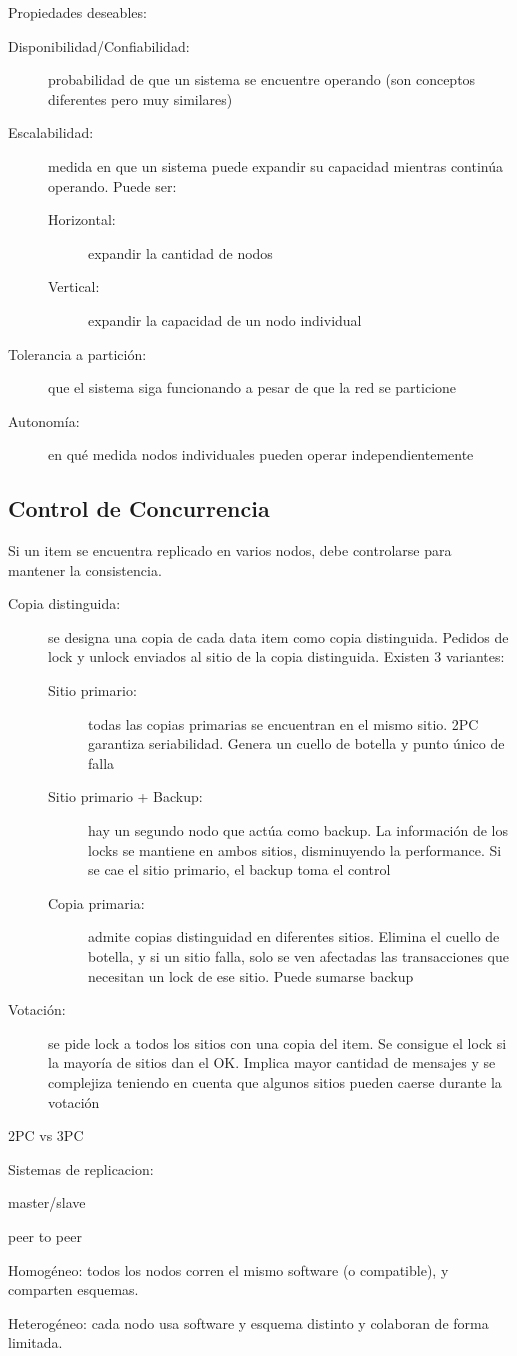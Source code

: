 Propiedades deseables:

\begin{description}
	\item[Disponibilidad/Confiabilidad:] probabilidad de que un sistema se encuentre operando (son conceptos diferentes pero muy similares)
	\item[Escalabilidad:] medida en que un sistema puede expandir su capacidad mientras continúa operando. Puede ser:
	\begin{description}
		\item[Horizontal:] expandir la cantidad de nodos
		\item[Vertical:] expandir la capacidad de un nodo individual
	\end{description}
	\item[Tolerancia a partición:] que el sistema siga funcionando a pesar de que la red se particione
	\item[Autonomía:] en qué medida nodos individuales pueden operar independientemente
\end{description}

\subsection{Control de Concurrencia}

Si un item se encuentra replicado en varios nodos, debe controlarse para mantener la consistencia.

\begin{description}
	\item[Copia distinguida:] se designa una copia de cada data item como copia distinguida. Pedidos de lock y unlock enviados al sitio de la copia distinguida. Existen 3 variantes:
	\begin{description}
		\item[Sitio primario:] todas las copias primarias se encuentran en el mismo sitio. 2PC garantiza seriabilidad. Genera un cuello de botella y punto único de falla
		\item[Sitio primario + Backup:] hay un segundo nodo que actúa como backup. La información de los locks se mantiene en ambos sitios, disminuyendo la performance. Si se cae el sitio primario, el backup toma el control
		\item[Copia primaria:] admite copias distinguidad en diferentes sitios. Elimina el cuello de botella, y si un sitio falla, solo se ven afectadas las transacciones que necesitan un lock de ese sitio. Puede sumarse backup
	\end{description}
	\item[Votación:] se pide lock a todos los sitios con una copia del item. Se consigue el lock si la mayoría de sitios dan el OK. Implica mayor cantidad de mensajes y se complejiza teniendo en cuenta que algunos sitios pueden caerse durante la votación
\end{description}

2PC vs 3PC

Sistemas de replicacion:

master/slave

peer to peer

Homogéneo: todos los nodos corren el mismo software (o compatible), y comparten esquemas.

Heterogéneo: cada nodo usa software y esquema distinto y colaboran de forma limitada.
